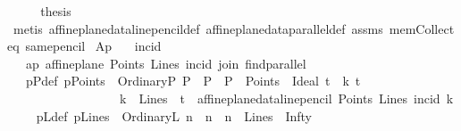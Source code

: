 \begin{isabellebody}
\ {\isacharminus}{\kern0pt}\isanewline
\ \ \isamarkupfalse%
\ {\isacharquery}{\kern0pt}thesis\isanewline
\ \ \isamarkupfalse%
\ {\isacharparenleft}{\kern0pt}metis\ affine{\isacharunderscore}{\kern0pt}plane{\isacharunderscore}{\kern0pt}data{\isachardot}{\kern0pt}line{\isacharunderscore}{\kern0pt}pencil{\isacharunderscore}{\kern0pt}def\ affine{\isacharunderscore}{\kern0pt}plane{\isacharunderscore}{\kern0pt}data{\isachardot}{\kern0pt}parallel{\isacharunderscore}{\kern0pt}def\ assms{\isacharparenleft}{\kern0pt}{}{\isacharparenright}{\kern0pt}\ mem{\isacharunderscore}{\kern0pt}Collect{\isacharunderscore}{\kern0pt}eq\ same{\isacharunderscore}{\kern0pt}pencil{\isacharparenright}{\kern0pt}\isanewline
{}\isamarkupfalse%
%
\endisatagproof
{\isafoldproof}%
%
\isadelimproof
\isanewline
%
\endisadelimproof
\isanewline
\isanewline
{}\isamarkupfalse%
\ Ap{}{\isacharcolon}{\kern0pt}\isanewline
\ \ \ incid\ {\isacharparenleft}{\kern0pt}\ {\isachardoublequoteopen}{\isasymlhd}{\isachardoublequoteclose}\ {}{}{\isacharparenright}{\kern0pt}\isanewline
\ \ \ ap{\isacharcolon}{\kern0pt}\ {\isachardoublequoteopen}affine{\isacharunderscore}{\kern0pt}plane\ Points\ Lines\ incid\ join\ find{\isacharunderscore}{\kern0pt}parallel{\isachardoublequoteclose}\isanewline
\ \ \ pPdef{\isacharcolon}{\kern0pt}\ {\isachardoublequoteopen}pPoints\ {\isasymequiv}\ {\isacharbraceleft}{\kern0pt}OrdinaryP\ P\ {\isacharbar}{\kern0pt}\ P\ {\isachardot}{\kern0pt}\ {\isacharparenleft}{\kern0pt}P\ {\isasymin}\ Points{\isacharparenright}{\kern0pt}{\isacharbraceright}{\kern0pt}\ {\isasymunion}\ {\isacharbraceleft}{\kern0pt}Ideal\ t\ {\isacharbar}{\kern0pt}\ k\ t\ {\isachardot}{\kern0pt}\ \isanewline
\ \ \ \ \ \ \ \ \ \ \ \ \ \ \ \ \ \ {\isacharparenleft}{\kern0pt}{\isacharparenleft}{\kern0pt}k\ {\isasymin}\ Lines{\isacharparenright}{\kern0pt}\ {\isasymand}\ {\isacharparenleft}{\kern0pt}t\ {\isacharequal}{\kern0pt}\ affine{\isacharunderscore}{\kern0pt}plane{\isacharunderscore}{\kern0pt}data{\isachardot}{\kern0pt}line{\isacharunderscore}{\kern0pt}pencil\ Points\ Lines\ {\isacharparenleft}{\kern0pt}incid{\isacharparenright}{\kern0pt}\ k{\isacharparenright}{\kern0pt}\ {\isacharparenright}{\kern0pt}{\isacharbraceright}{\kern0pt}{\isachardoublequoteclose}\isanewline
\ \ \ pLdef{\isacharcolon}{\kern0pt}\ {\isachardoublequoteopen}pLines\ {\isasymequiv}\ {\isacharbraceleft}{\kern0pt}OrdinaryL\ n\ {\isacharbar}{\kern0pt}\ n\ {\isachardot}{\kern0pt}\ {\isacharparenleft}{\kern0pt}n\ {\isasymin}\ Lines{\isacharparenright}{\kern0pt}{\isacharbraceright}{\kern0pt}\ {\isasymunion}\ {\isacharbraceleft}{\kern0pt}Infty{\isacharbraceright}{\kern0pt}{\isachardoublequoteclose}\isanewline

\end{isabellebody}

